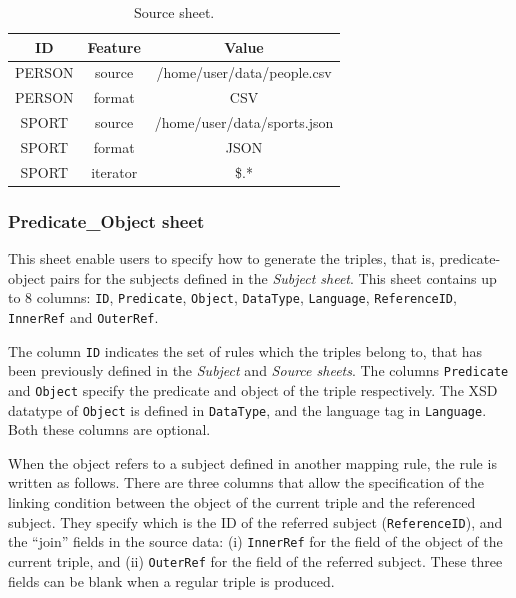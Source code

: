 \begin{table}[h!]
\caption{Source sheet.}
\label{tab:chp5-1_source_sheet}
\centering
\begin{tabular}{c|c|c}
\midrule
\textbf{ID} & \textbf{Feature} & \textbf{Value}              \\ \midrule
PERSON    & source          & /home/user/data/people.csv  \\
PERSON    & format          & CSV                         \\
SPORT     & source          & /home/user/data/sports.json \\
SPORT     & format          & JSON                        \\  
SPORT     & iterator        & \$.*                    \\ \midrule
\end{tabular}
\end{table}

\subsubsection{Predicate\_Object sheet} 
This sheet enable users to specify how to generate the triples, that is, predicate-object pairs for the subjects defined in the \textit{Subject sheet}. This sheet contains up to 8 columns: \texttt{ID}, \texttt{Predicate}, \texttt{Object}, \texttt{DataType}, \texttt{Language}, \texttt{ReferenceID}, \texttt{InnerRef} and \texttt{OuterRef}.

The column \texttt{ID} indicates the set of rules which the triples belong to, that has been previously defined in the \textit{Subject} and \textit{Source sheets}.
The columns \texttt{Predicate} and \texttt{Object} specify the predicate and object of the triple respectively. 
The XSD datatype of \texttt{Object} is defined in \texttt{DataType}, and the language tag in \texttt{Language}. Both these columns are optional. 

When the object refers to a subject defined in another mapping rule, the rule is written as follows. 
There are three columns that allow the specification of the linking condition between the object of the current triple and the referenced subject. 
They specify which is the ID of the referred subject  (\texttt{ReferenceID}), and the ``join'' fields in the source data: (i) \texttt{InnerRef} for the field of the object of the current triple, and (ii) \texttt{OuterRef} for the field of the referred subject. These three fields can be blank when a regular triple is produced. 

